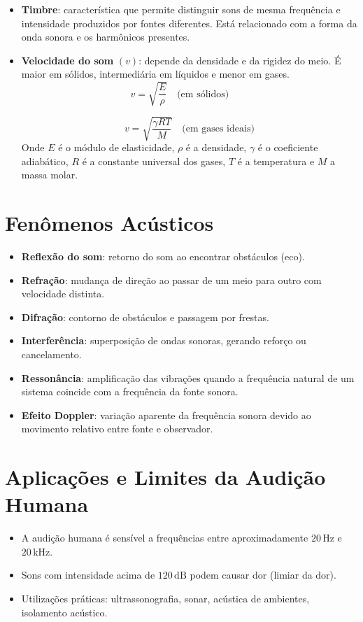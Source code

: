 \documentclass[a4paper,12pt]{article}
\begin{document}
\begin{multicols}{2}
\begin{itemize}
    \item \textbf{Timbre}: característica que permite distinguir sons de mesma frequência e intensidade produzidos por fontes diferentes. Está relacionado com a forma da onda sonora e os harmônicos presentes.
    
    \item \textbf{Velocidade do som} $(v)$: depende da densidade e da rigidez do meio. É maior em sólidos, intermediária em líquidos e menor em gases.
    \[
        v = \sqrt{\frac{E}{\rho}} \quad \text{(em sólidos)} \qquad
    \]

    \[
        v = \sqrt{\frac{\gamma R T}{M}} \quad \text{(em gases ideais)}
    \]
    Onde $E$ é o módulo de elasticidade, $\rho$ é a densidade, $\gamma$ é o coeficiente adiabático, $R$ é a constante universal dos gases, $T$ é a temperatura e $M$ a massa molar.
\end{itemize}

\section{Fenômenos Acústicos}
\begin{itemize}
    \item \textbf{Reflexão do som}: retorno do som ao encontrar obstáculos (eco).
    \item \textbf{Refração}: mudança de direção ao passar de um meio para outro com velocidade distinta.
    \item \textbf{Difração}: contorno de obstáculos e passagem por frestas.
    \item \textbf{Interferência}: superposição de ondas sonoras, gerando reforço ou cancelamento.
    \item \textbf{Ressonância}: amplificação das vibrações quando a frequência natural de um sistema coincide com a frequência da fonte sonora.
    \item \textbf{Efeito Doppler}: variação aparente da frequência sonora devido ao movimento relativo entre fonte e observador.
\end{itemize}

\section{Aplicações e Limites da Audição Humana}
\begin{itemize}
    \item A audição humana é sensível a frequências entre aproximadamente $20\,\text{Hz}$ e $20\,\text{kHz}$.
    \item Sons com intensidade acima de $120\,\text{dB}$ podem causar dor (limiar da dor).
    \item Utilizações práticas: ultrassonografia, sonar, acústica de ambientes, isolamento acústico.
\end{itemize}


\end{multicols}
\end{document}

